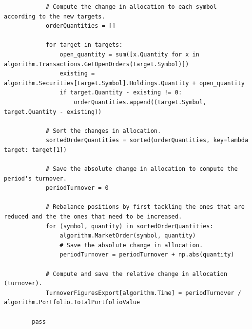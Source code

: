 \begin{verbatim}
            # Compute the change in allocation to each symbol according to the new targets.
            orderQuantities = []
            
            for target in targets:
                open_quantity = sum([x.Quantity for x in algorithm.Transactions.GetOpenOrders(target.Symbol)])
                existing = algorithm.Securities[target.Symbol].Holdings.Quantity + open_quantity
                if target.Quantity - existing != 0:
                    orderQuantities.append((target.Symbol, target.Quantity - existing))
                
            # Sort the changes in allocation.
            sortedOrderQuantities = sorted(orderQuantities, key=lambda target: target[1])
            
            # Save the absolute change in allocation to compute the period's turnover.
            periodTurnover = 0
            
            # Rebalance positions by first tackling the ones that are reduced and the the ones that need to be increased.
            for (symbol, quantity) in sortedOrderQuantities:
                algorithm.MarketOrder(symbol, quantity)
                # Save the absolute change in allocation.
                periodTurnover = periodTurnover + np.abs(quantity)
                
            # Compute and save the relative change in allocation (turnover).
            TurnoverFiguresExport[algorithm.Time] = periodTurnover / algorithm.Portfolio.TotalPortfolioValue
            
        pass
\end{verbatim}